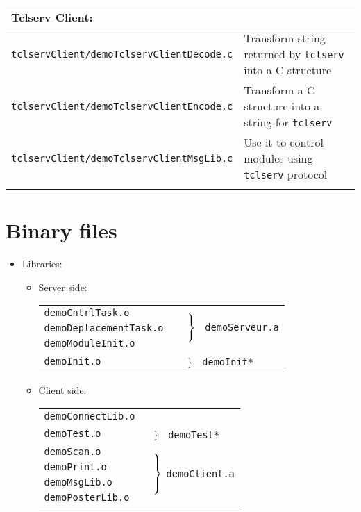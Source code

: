 \begin{center}
\begin{tabularx}{\linewidth}{|l|X|}
 \hline
 \multicolumn{2}{|l|}{Tclserv Client:} \\
 \hline
 \texttt{tclservClient/demoTclservClientDecode.c}  & Transform string returned by \texttt{tclserv} into a C structure\\
 \texttt{tclservClient/demoTclservClientEncode.c}  & Transform a C structure into a string for \texttt{tclserv} \\
 \texttt{tclservClient/demoTclservClientMsgLib.c} & Use it to control modules using \texttt{tclserv} protocol\\
 \hline
 \multicolumn{2}{l}{} \\
 \end{tabularx}
\end{center}

\vfill\eject
\section{Binary files}

\begin{itemize}

\item Libraries:

	\begin{itemize}
	\item Server side:

		\vspace{.3cm}
		{\small
		\begin{tabular}{ll}
		\cline{1-1}
		\tt demoCntrlTask.o &
			\multirow{3}{3.5cm}{\
			$\left.{\vrule width 0pt height .6cm} \right\}$ \
			\tt demoServeur.a} \\
		\tt demoDeplacementTask.o \\
		\tt demoModuleInit.o	\\
		\cline{1-1}
		\tt demoInit.o		
		    & 	\multirow{1}{3.5cm}{\
		      	$\left.{\vrule width 0pt} \right\}$
		      	\tt ~demoInit*}  \\
		\cline{1-1}
		\end{tabular}
		}
		\vspace{.3cm}

	\item Client side:

		\vspace{.3cm}
		{\small
		\begin{tabular}{ll}
		\cline{1-1}
		\tt demoConnectLib.o \\
		\cline{1-1}
		\tt demoTest.o 
		    & 	\multirow{1}{3.5cm}{
		      	$\left.{\vrule width 0pt} \right\}$
		      	\tt ~demoTest*}  \\
		\cline{1-1}
		\tt demoScan.o	
		    &	\multirow{4}{3.5cm}{
			$\left.{\vrule width 0pt height .8cm} \right\}$
			\tt demoClient.a}\\
		\tt demoPrint.o		\\
		\tt demoMsgLib.o	\\
		\tt demoPosterLib.o	\\
		\cline{1-1}
		\end{tabular}
		}
	\end{itemize}

\end{itemize}
